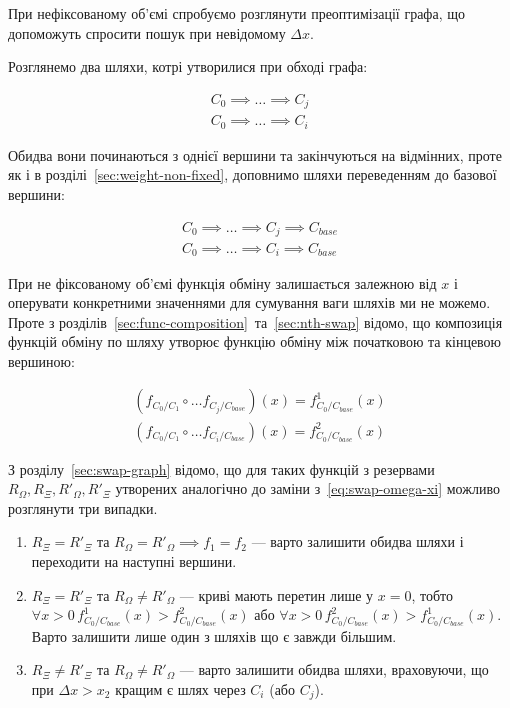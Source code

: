 \documentclass[14pt]{extarticle}
\begin{document}
При нефіксованому об'ємі спробуємо розглянути преоптимізації графа, що
допоможуть спросити пошук при невідомому $\Delta x$.

Розглянемо два шляхи, котрі утворилися при обході графа:

\begin{equation*}
 \begin{aligned}
   C_{0} \implies \ldots \implies C_{j} \\
   C_{0} \implies \ldots \implies C_{i}
 \end{aligned}
\end{equation*}

Обидва вони починаються з однієї вершини та закінчуються на відмінних, проте як
і в розділі~\ref{sec:weight-non-fixed}, доповнимо шляхи переведенням до базової
вершини:

\begin{equation*}
 \begin{aligned}
   C_{0} \implies \ldots \implies C_{j} \implies C_{base}\\
   C_{0} \implies \ldots \implies C_{i} \implies C_{base}
 \end{aligned}
\end{equation*}

При не фіксованому об'ємі функція обміну залишається залежною від $x$ і
оперувати конкретними значеннями для сумування ваги шляхів ми не можемо. Проте з
розділів~\ref{sec:func-composition}~та~\ref{sec:nth-swap} відомо, що композиція
функцій обміну по шляху утворює функцію обміну між початковою та кінцевою
вершиною:

\begin{equation*}
 \begin{aligned}
   (f_{C_{0}/C_{1}} \circ \ldots f_{C_{j}/C_{base}})(x) = f_{C_{0}/C_{base}}^{1}(x)\\
   (f_{C_{0}/C_{1}} \circ \ldots f_{C_{i}/C_{base}})(x) = f_{C_{0}/C_{base}}^{2}(x)
 \end{aligned}
\end{equation*}

З розділу~\ref{sec:swap-graph} відомо, що для таких функцій з резервами
$R_{\Omega}, R_{\Xi}, R'_{\Omega}, R'_{\Xi}$ утворених аналогічно до заміни
з~\eqref{eq:swap-omega-xi} можливо розглянути три випадки.

\begin{enumerate}
  \item $R_{\Xi} = R'_{\Xi}$ та $R_{\Omega} = R'_{\Omega} \implies f_{1} = f_{2}$ --- варто
		залишити обидва шляхи і переходити на наступні вершини.
  \item $R_{\Xi} = R'_{\Xi}$ та $R_{\Omega} \neq R'_{\Omega}$ --- криві мають перетин лише у
		$x = 0$, тобто
		$\forall x > 0 \, f_{C_{0}/C_{base}}^{1}(x) > f_{C_{0}/C_{base}}^{2}(x)$ або
		$\forall x > 0 \, f_{C_{0}/C_{base}}^{2}(x) > f_{C_{0}/C_{base}}^{1}(x)$. Варто
		залишити лише один з шляхів що є завжди більшим.
  \item $R_{\Xi} \neq R'_{\Xi}$ та $R_{\Omega} \neq R'_{\Omega}$ --- варто залишити обидва шляхи,
		враховуючи, що при $\Delta x > x_{2}$ кращим є шлях через $C_{i}$ (або
		$C_{j}$).
\end{enumerate}
\end{document}
